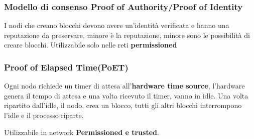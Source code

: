 \subsubsection{Modello di consenso Proof of Authority/Proof of Identity}
I nodi che creano blocchi devono avere un'identità verificata e hanno una reputazione da preservare, minore è la reputazione, minore sono le possibilità di creare blocchi.
Utilizzabile solo nelle reti \textbf{permissioned}

\subsubsection{Proof of Elapsed Time(PoET)}
Ogni nodo richiede un timer di attesa all'\textbf{hardware time source}, l'hardware genera il tempo di attesa
e una volta ricevuto il timer, vanno in idle.
Una volta ripartito dall'idle, il nodo, crea un blocco, tutti gli altri blocchi interrompono l'idle e il processo riparte.

Utilizzabile in network \textbf{Permissioned e trusted}.